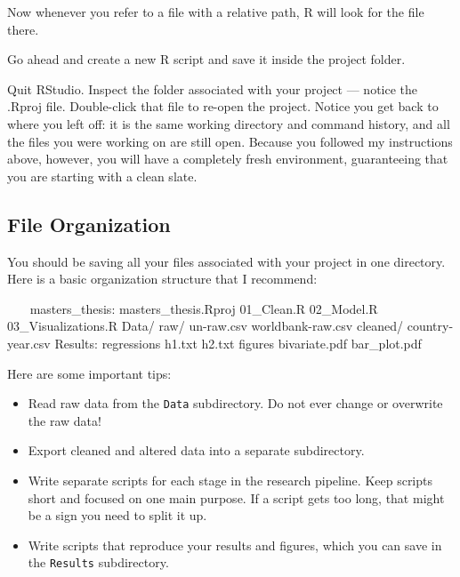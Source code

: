 \documentclass[]{book}
\newenvironment{Shaded}{\begin{snugshade}}{\end{snugshade}}
\newcommand{\BaseNTok}[1]{\textcolor[rgb]{0.00,0.00,0.81}{#1}}
\newcommand{\NormalTok}[1]{#1}
\providecommand{\tightlist}{%
  \setlength{\itemsep}{0pt}\setlength{\parskip}{0pt}}
\begin{document}
Now whenever you refer to a file with a relative path, R will look for
the file there.

Go ahead and create a new R script and save it inside the project
folder.

Quit RStudio. Inspect the folder associated with your project --- notice
the .Rproj file. Double-click that file to re-open the project. Notice
you get back to where you left off: it is the same working directory and
command history, and all the files you were working on are still open.
Because you followed my instructions above, however, you will have a
completely fresh environment, guaranteeing that you are starting with a
clean slate.

\subsection{File Organization}\label{file-organization}

You should be saving all your files associated with your project in one
directory. Here is a basic organization structure that I recommend:

\begin{Shaded}
\begin{Highlighting}[]
\NormalTok{~~~}
\NormalTok{masters_thesis:}
\NormalTok{  masters_thesis.Rproj}
\NormalTok{  01_Clean.R}
\NormalTok{  02_Model.R}
\NormalTok{  03_Visualizations.R}
\NormalTok{  Data/}
\BaseNTok{    raw/}
\BaseNTok{      un-raw.csv}
\BaseNTok{      worldbank-raw.csv}
\BaseNTok{    cleaned/}
\BaseNTok{      country-year.csv}
\NormalTok{  Results:}
\BaseNTok{    regressions}
\BaseNTok{      h1.txt}
\BaseNTok{      h2.txt}
\BaseNTok{    figures}
\BaseNTok{      bivariate.pdf}
\BaseNTok{      bar_plot.pdf}
\NormalTok{~~~}
\end{Highlighting}
\end{Shaded}

Here are some important tips:

\begin{itemize}
\tightlist
\item
  Read raw data from the \texttt{Data} subdirectory. Do not ever change
  or overwrite the raw data!
\item
  Export cleaned and altered data into a separate subdirectory.
\item
  Write separate scripts for each stage in the research pipeline. Keep
  scripts short and focused on one main purpose. If a script gets too
  long, that might be a sign you need to split it up.
\item
  Write scripts that reproduce your results and figures, which you can
  save in the \texttt{Results} subdirectory.
\end{itemize}
\end{document}
